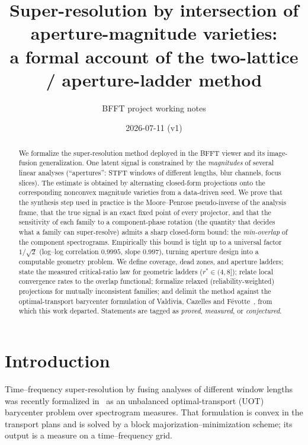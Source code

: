 \documentclass[11pt]{article}
\title{Super-resolution by intersection of aperture-magnitude varieties:\\
a formal account of the two-lattice / aperture-ladder method}
\author{BFFT project working notes}
\date{2026-07-11 \; (v1)}
\theoremstyle{definition}
\begin{document}
\maketitle

\begin{abstract}
We formalize the super-resolution method deployed in the BFFT viewer and its
image-fusion generalization.  One latent signal is constrained by the
\emph{magnitudes} of several linear analyses (``apertures'': STFT windows of
different lengths, blur channels, focus slices).  The estimate is obtained by
alternating closed-form projections onto the corresponding nonconvex
magnitude varieties from a data-driven seed.  We prove that the synthesis
step used in practice is the Moore--Penrose pseudo-inverse of the analysis
frame, that the true signal is an exact fixed point of every projector, and
that the sensitivity of each family to a component-phase rotation (the
quantity that decides what a family can super-resolve) admits a sharp
closed-form bound: the \emph{min-overlap} of the component spectrograms.
Empirically this bound is tight up to a universal factor
$1/\sqrt2$ (log--log correlation $0.9995$, slope $0.997$), turning aperture
design into a computable geometry problem.  We define coverage, dead zones,
and aperture ladders; state the measured critical-ratio law for geometric
ladders ($r^{*}\in(4,8]$); relate local convergence rates to the overlap
functional; formalize relaxed (reliability-weighted) projections for
mutually inconsistent families; and delimit the method against the
optimal-transport barycenter formulation of Valdivia, Cazelles and
F\'evotte~\cite{valdivia2026}, from which this work departed.  Statements
are tagged as \emph{proved}, \emph{measured}, or \emph{conjectured}.
\end{abstract}

\section{Introduction}

Time--frequency super-resolution by fusing analyses of different window
lengths was recently formalized in~\cite{valdivia2026} as an unbalanced
optimal-transport (UOT) barycenter problem over spectrogram measures.  That
formulation is convex in the transport plans and is solved by a block
majorization--minimization scheme; its output is a measure on a
time--frequency grid.
\end{document}
